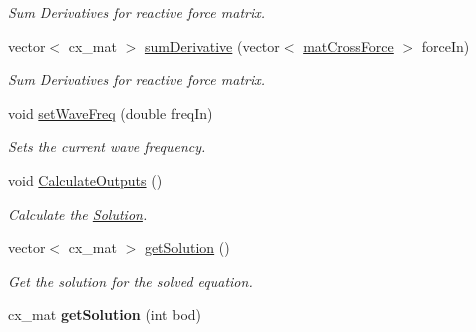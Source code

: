 \begin{DoxyCompactItemize}
\begin{DoxyCompactList}\small\item\em Sum Derivatives for reactive force matrix. \end{DoxyCompactList}\item 
vector$<$ cx\-\_\-mat $>$ \hyperlink{class_motion_solver_a6728b7250a3c73a6aa50be51047f5a91}{sum\-Derivative} (vector$<$ \hyperlink{classmat_cross_force}{mat\-Cross\-Force} $>$ force\-In)
\begin{DoxyCompactList}\small\item\em Sum Derivatives for reactive force matrix. \end{DoxyCompactList}\item 
void \hyperlink{class_motion_solver_a5deee421d26ef9729e0a870fd48b4403}{set\-Wave\-Freq} (double freq\-In)
\begin{DoxyCompactList}\small\item\em Sets the current wave frequency. \end{DoxyCompactList}\item 
\hypertarget{class_motion_solver_ae072dd17e5535185100a4505adf2c627}{void \hyperlink{class_motion_solver_ae072dd17e5535185100a4505adf2c627}{Calculate\-Outputs} ()}\label{class_motion_solver_ae072dd17e5535185100a4505adf2c627}

\begin{DoxyCompactList}\small\item\em Calculate the \hyperlink{class_solution}{Solution}. \end{DoxyCompactList}\item 
vector$<$ cx\-\_\-mat $>$ \hyperlink{class_motion_solver_a31dee35ce228eacf14e48c59fc98481b}{get\-Solution} ()
\begin{DoxyCompactList}\small\item\em Get the solution for the solved equation. \end{DoxyCompactList}\item 
\hypertarget{class_motion_solver_a114d7cc652f8202d5da7e23beb9e3232}{cx\-\_\-mat {\bfseries get\-Solution} (int bod)}\label{class_motion_solver_a114d7cc652f8202d5da7e23beb9e3232}

\end{DoxyCompactItemize}


